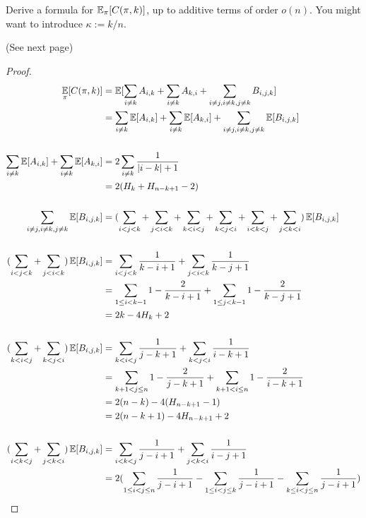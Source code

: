 \documentclass[11pt,a4paper,oneside]{article}
\newcommand{\E}{\mathop{\mathbb{E\/}}}
\begin{document}
\begin{problem}{9}
\statement
Derive a formula for $\E_{\pi} [C(\pi,k)]$, up to additive terms of order $o(n)$.
You might want to introduce $\kappa := k/n$.

\solution
(See next page)
\begin{proof}
    \[
        \begin{split}
            \E_{\pi} [C(\pi,k)] &= \E[\sum_{i \not= k}A_{i, k} + \sum_{i \not= k}A_{k, i} + \sum_{i \not= j, i \not= k,j \not= k}B_{i, j, k}]\\
            &= \sum_{i \not= k}\E[A_{i, k}] + \sum_{i \not= k}\E[A_{k, i}] + \sum_{i \not= j, i \not= k,j \not= k}\E[B_{i, j, k}]\\\\
            \sum_{i \not= k}\E[A_{i, k}] + \sum_{i \not= k}\E[A_{k, i}] &= 2\sum_{i \not= k}\frac{1}{|i - k| + 1} \\
            &= 2(H_k + H_{n - k + 1} - 2)\\\\
            \sum_{i \not= j, i \not= k,j \not= k}\E[B_{i, j, k}] &= (\sum_{i < j < k} + \sum_{j < i < k} + \sum_{k < i < j} + \sum_{k < j < i} + \sum_{i < k < j} + \sum_{j < k < i}) \E[B_{i, j, k}] \\\\
            (\sum_{i < j < k} + \sum_{j < i < k})\E[B_{i, j, k}] &= \sum_{i < j < k}\frac{1}{k - i + 1} + \sum_{j < i < k}\frac{1}{k - j + 1}\\
            &= \sum_{1 \leq i < k - 1}1 - \frac{2}{k - i + 1} + \sum_{1 \leq j < k - 1} 1 - \frac{2}{k - j + 1}\\
            &= 2k - 4H_k + 2\\\\
            (\sum_{k < i < j} + \sum_{k < j < i})\E[B_{i, j, k}] &= \sum_{k < i < j}\frac{1}{j - k + 1} + \sum_{k < j < i}\frac{1}{i - k + 1}\\
            &= \sum_{k + 1 < j \leq n}1 - \frac{2}{j - k + 1} + \sum_{k + 1 < i \leq n} 1 - \frac{2}{i - k + 1}\\
            &= 2(n - k) - 4(H_{n - k + 1} - 1)\\
            &= 2(n - k + 1) - 4H_{n - k + 1} + 2\\\\
            (\sum_{i < k < j} + \sum_{j < k < i}) \E[B_{i, j, k}] &= \sum_{i < k < j}\frac{1}{j - i + 1} + \sum_{j < k < i}\frac{1}{i - j + 1} \\
            &= 2(\sum_{1 \leq i < j \leq n}\frac{1}{j - i + 1} - \sum_{1 \leq i < j \leq k}\frac{1}{j - i + 1} - \sum_{k \leq i < j \leq n}\frac{1}{j - i + 1})\\

\end{split}\]
\end{proof}
\end{problem}
\end{document}
